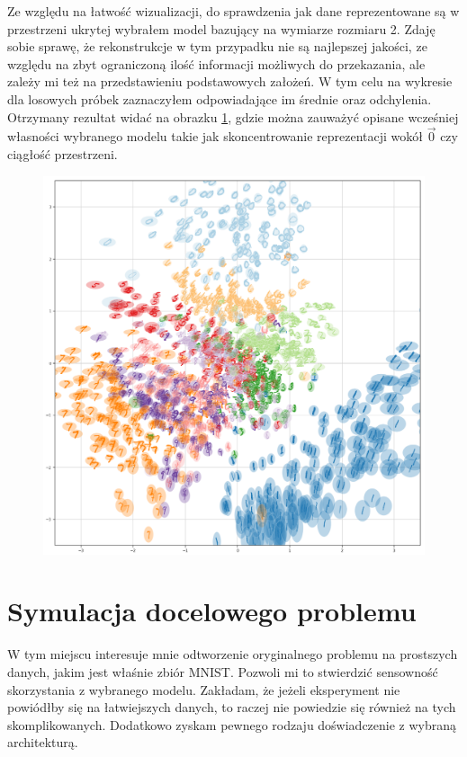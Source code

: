 Ze względu na łatwość wizualizacji, do sprawdzenia jak dane reprezentowane są w przestrzeni ukrytej wybrałem model bazujący na wymiarze rozmiaru 2. Zdaję sobie sprawę, że rekonstrukcje w tym przypadku nie są najlepszej jakości, ze względu na zbyt ograniczoną ilość informacji możliwych do przekazania, ale zależy mi też na przedstawieniu podstawowych założeń. W tym celu na wykresie dla losowych próbek zaznaczyłem odpowiadające im średnie oraz odchylenia. Otrzymany rezultat widać na obrazku \ref{fig:mnist_2d}, gdzie można zauważyć opisane wcześniej własności wybranego modelu takie jak skoncentrowanie reprezentacji wokół $\vec{0}$ czy ciągłość przestrzeni.

\begin{figure}[h!]
    \includegraphics[width=1.2\textwidth,center]{images/mnist_2d}
    \caption{}
    \label{fig:mnist_2d}
\end{figure}

\section{Symulacja docelowego problemu}

W tym miejscu interesuje mnie odtworzenie oryginalnego problemu na prostszych danych, jakim jest właśnie zbiór MNIST. Pozwoli mi to stwierdzić sensowność skorzystania z wybranego modelu. Zakładam, że jeżeli eksperyment nie powiódłby się na łatwiejszych danych, to raczej nie powiedzie się również na tych skomplikowanych. Dodatkowo zyskam pewnego rodzaju doświadczenie z wybraną architekturą.

